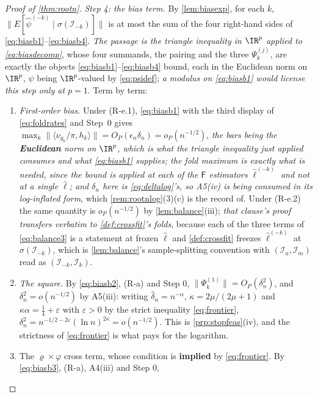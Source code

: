 \begin{proof}[Proof of \cref{thm:rootn}]
\emph{Step 4: the bias term.} By \cref{lem:biasexp}, for each $k$,
$\|E[\hat\psi^{(-k)}\mid\sigma(\mathcal I_{-k})]\|$ is at most the sum of the four right-hand sides of
\eqref{eq:biasb1}--\eqref{eq:biasb4}. \emph{The passage is the triangle inequality in $\IR^{p}$ applied to
\eqref{eq:biasdecomp}}, whose four summands, the pairing and the three $\Psi^{(j)}_k$, are exactly
the objects \eqref{eq:biasb1}--\eqref{eq:biasb4} bound, each in the Euclidean norm on $\IR^{p}$, $\psi$
being $\IR^{p}$-valued by \eqref{eq:psidef}; \emph{a modulus on \eqref{eq:biasb1} would license this step
only at $p=1$}. Term by term:
\begin{enumerate}
\item[(a)] \emph{First-order bias.} Under (R-e.1), \eqref{eq:biasb1} with the third display of
\eqref{eq:foldrates} and Step~0 gives
$\max_k\big\|\langle\nu_{g_k}/\pi,h_k\rangle\big\|=O_P(\epsilon_n\delta_n)=o_P(n^{-1/2})$, \emph{the bars
being the \textbf{Euclidean} norm on $\IR^{p}$, which is what the triangle inequality just applied consumes
and what \eqref{eq:biasb1} supplies; the fold
maximum is exactly what is needed, since the bound is applied at each of the $\mathsf F$ estimators
$\hat\ell^{(-k)}$ and not at a single $\hat\ell$; and $\delta_n$ here is \eqref{eq:deltalog}'s, so A5(iv)
is being consumed in its log-inflated form}, which \cref{rem:rootnlog}(3)(c) is the record of. Under
(R-e.2) the same quantity is $o_P(n^{-1/2})$ by \cref{lem:balance}(iii); \emph{that clause's proof
transfers verbatim to \cref{def:crossfit}'s folds}, because each of the three terms of
\eqref{eq:balance3} is a statement at frozen $\hat\ell$ and \cref{def:crossfit} freezes $\hat\ell^{(-k)}$
at $\sigma(\mathcal I_{-k})$, which is \cref{lem:balance}'s sample-splitting convention with
$(\mathcal I_a,\mathcal I_m)$ read as $(\mathcal I_{-k},\mathcal I_k)$.
\item[(b)] \emph{The square.} By \eqref{eq:biasb2}, (R-a) and Step 0,
$\|\Psi^{(1)}_k\|=O_P(\delta_n^{2})$, and $\delta_n^{2}=o(n^{-1/2})$ by A5(iii): writing
$\hat\delta_n=n^{-\alpha}$, $\kappa=2\mu/(2\mu+1)$ and $\kappa\alpha=\tfrac14+\varepsilon$ with
$\varepsilon>0$ by the strict inequality \eqref{eq:frontier},
$\delta_n^{2}=n^{-1/2-2\varepsilon}(\ln n)^{2\kappa}=o(n^{-1/2})$. This is
\cref{prp:stopfeas}\textup{(iv)}, and the strictness of \eqref{eq:frontier} is what pays for the
logarithm.
\item[(c)] The $\varrho\times\varphi$ cross term, whose condition is \textbf{implied} by
\eqref{eq:frontier}. By \eqref{eq:biasb3}, (R-a), A4(iii) and Step 0,

\end{enumerate}
\end{proof}
